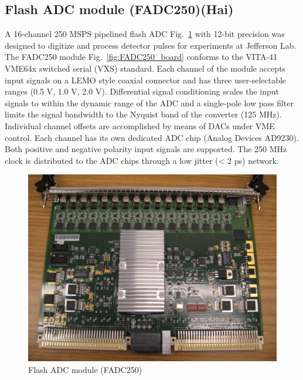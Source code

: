 \subsection{Flash ADC module (FADC250)(Hai)}

A 16-channel 250 MSPS pipelined flash ADC Fig.~\ref{fig:FADC250pic} with 12-bit precision was designed to digitize and process detector pulses for experiments at Jefferson Lab.  The FADC250 module Fig.~\ref{fig:FADC250_board} conforms to the VITA-41 VME64x switched serial (VXS) standard.  Each channel of the module accepts input signals on a LEMO style coaxial connector and has three user-selectable ranges (0.5 V, 1.0 V, 2.0 V).  Differential signal conditioning scales the input signals to within the dynamic range of the ADC and a single-pole low pass filter limits the signal bandwidth to the Nyquist band of the converter (125 MHz). Individual channel offsets are accomplished by means of DACs under VME control.  Each channel has its own dedicated ADC chip (Analog Devices AD9230). Both positive and negative polarity input signals are supported. The 250 MHz clock is distributed to the ADC chips through a low jitter (< 2 ps) network.  

\begin{figure}[hbt]
	\centering
	\includegraphics[width=1.0\columnwidth,keepaspectratio]{img/FADC250pic.jpg}
	\caption{Flash ADC module (FADC250)}
	\label{fig:FADC250pic}
\end{figure}

